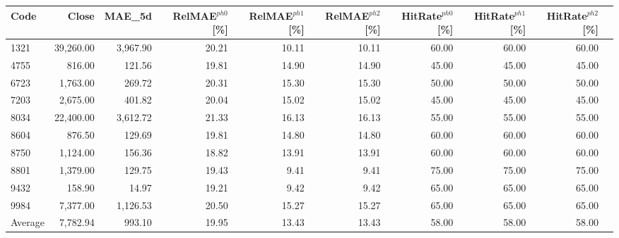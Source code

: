 \begingroup
\footnotesize
\begin{tabular}{lrrrrrrrrr}
\hline
Code & Close & MAE\_5d & RelMAE$^{ph0}$[\%] & RelMAE$^{ph1}$[\%] & RelMAE$^{ph2}$[\%] & HitRate$^{ph0}$[\%] & HitRate$^{ph1}$[\%] & HitRate$^{ph2}$[\%] \\
\hline
1321 & 39,260.00 & 3,967.90 & 20.21 & 10.11 & 10.11 & 60.00 & 60.00 & 60.00 \\
4755 & 816.00 & 121.56 & 19.81 & 14.90 & 14.90 & 45.00 & 45.00 & 45.00 \\
6723 & 1,763.00 & 269.72 & 20.31 & 15.30 & 15.30 & 50.00 & 50.00 & 50.00 \\
7203 & 2,675.00 & 401.82 & 20.04 & 15.02 & 15.02 & 45.00 & 45.00 & 45.00 \\
8034 & 22,400.00 & 3,612.72 & 21.33 & 16.13 & 16.13 & 55.00 & 55.00 & 55.00 \\
8604 & 876.50 & 129.69 & 19.81 & 14.80 & 14.80 & 60.00 & 60.00 & 60.00 \\
8750 & 1,124.00 & 156.36 & 18.82 & 13.91 & 13.91 & 60.00 & 60.00 & 60.00 \\
8801 & 1,379.00 & 129.75 & 19.43 & 9.41 & 9.41 & 75.00 & 75.00 & 75.00 \\
9432 & 158.90 & 14.97 & 19.21 & 9.42 & 9.42 & 65.00 & 65.00 & 65.00 \\
9984 & 7,377.00 & 1,126.53 & 20.50 & 15.27 & 15.27 & 65.00 & 65.00 & 65.00 \\
Average & 7,782.94 & 993.10 & 19.95 & 13.43 & 13.43 & 58.00 & 58.00 & 58.00 \\
\hline
\end{tabular}
\endgroup